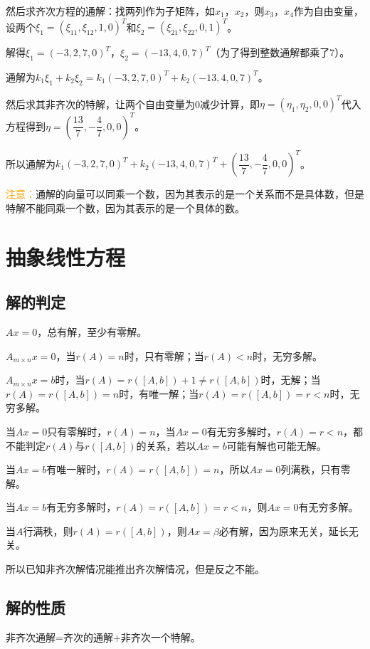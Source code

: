 \documentclass[UTF8, 12pt]{ctexart}
\begin{document}
然后求齐次方程的通解：找两列作为子矩阵，如$x_1$，$x_2$，则$x_3$，$x_4$作为自由变量，设两个$\xi_1=(\xi_{11},\xi_{12},1,0)^T$和$\xi_2=(\xi_{21},\xi_{22},0,1)^T$。

解得$\xi_1=(-3,2,7,0)^T$，$\xi_2=(-13,4,0,7)^T$（为了得到整数通解都乘了7）。

通解为$k_1\xi_1+k_2\xi_2=k_1(-3,2,7,0)^T+k_2(-13,4,0,7)^T$。

然后求其非齐次的特解，让两个自由变量为0减少计算，即$\eta=(\eta_1,\eta_2,0,0)^T$代入方程得到$\eta=\left(\dfrac{13}{7},-\dfrac{4}{7},0,0\right)^T$。

所以通解为$k_1(-3,2,7,0)^T+k_2(-13,4,0,7)^T+\left(\dfrac{13}{7},-\dfrac{4}{7},0,0\right)^T$。

\textcolor{orange}{注意：}通解的向量可以同乘一个数，因为其表示的是一个关系而不是具体数，但是特解不能同乘一个数，因为其表示的是一个具体的数。

\section{抽象线性方程}

\subsection{解的判定}

$Ax=0$，总有解，至少有零解。

$A_{m\times n}x=0$，当$r(A)=n$时，只有零解；当$r(A)<n$时，无穷多解。

$A_{m\times n}x=b$时，当$r(A)=r([A,b])+1\neq r([A,b])$时，无解；当$r(A)=r([A,b])=n$时，有唯一解；当$r(A)=r([A,b])=r<n$时，无穷多解。

当$Ax=0$只有零解时，$r(A)=n$，当$Ax=0$有无穷多解时，$r(A)=r<n$，都不能判定$r(A)$与$r([A,b])$的关系，若以$Ax=b$可能有解也可能无解。

当$Ax=b$有唯一解时，$r(A)=r([A,b])=n$，所以$Ax=0$列满秩，只有零解。

当$Ax=b$有无穷多解时，$r(A)=r([A,b])=r<n$，则$Ax=0$有无穷多解。

当$A$行满秩，则$r(A)=r([A,b])$，则$Ax=\beta$必有解，因为原来无关，延长无关。

所以已知非齐次解情况能推出齐次解情况，但是反之不能。

\subsection{解的性质}

非齐次通解=齐次的通解+非齐次一个特解。
\end{document}
